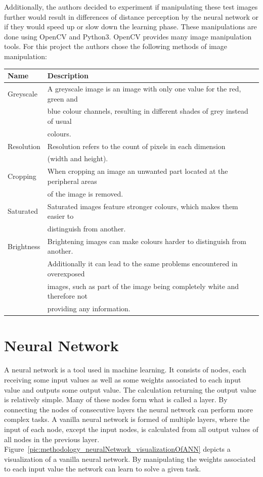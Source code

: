 Additionally, the authors decided to experiment if manipulating these test images further would result in differences of distance perception by the neural network or if they would speed up or slow down the learning phase. These manipulations are done using OpenCV and Python3. OpenCV provides many image manipulation tools. For this project the authors chose the following methods of image manipulation:

\begin{table}[h!]
	\begin{tabular}{|l|l|}
		\hline
		\bfseries Name & \bfseries Description \\
		\hline
		Greyscale & A greyscale image is an image with only one value for the red, green and \\
		& blue colour channels, resulting in different shades of grey instead of usual \\
		& colours. \\
		\hline
		Resolution & Resolution refers to the count of pixels in each dimension \\
		& (width and height). \\
		\hline
		Cropping & When cropping an image an unwanted part located at the peripheral areas \\
		& of the image is removed. \\
		\hline
		Saturated & Saturated images feature stronger colours, which makes them easier to \\
		& distinguish from another. \\
		\hline
		Brightness & Brightening images can make colours harder to distinguish from another. \\
		& Additionally it can lead to the same problems encountered in overexposed \\
		& images, such as part of the image being completely white and therefore not \\
		& providing any information. \\
		\hline
	\end{tabular}
\end{table}


\section{Neural Network}
A neural network is a tool used in machine learning. It consists of nodes, each receiving some input values as well as some weights associated to each input value and outputs some output value. The calculation returning the output value is relatively simple. Many of these nodes form what is called a layer. By connecting the nodes of consecutive layers the neural network can perform more complex tasks.
A vanilla neural network is formed of multiple layers, where the input of each node, except the input nodes, is calculated from all output values of all nodes in the previous layer.
Figure~\ref{pic:methodology_neuralNetwork_visualizationOfANN} depicts a visualization of a vanilla neural network. By manipulating the weights associated to each input value the network can learn to solve a given task.

